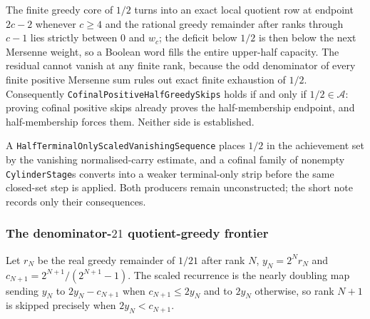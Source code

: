 \begin{thm}
The finite greedy core of $1/2$ turns into an exact local quotient row at
endpoint $2c-2$ whenever $c\ge4$ and the rational greedy remainder after
ranks through $c-1$ lies strictly between $0$ and $w_c$; the deficit below
$1/2$ is then below the next Mersenne weight, so a Boolean word fills the
entire upper-half capacity.  The residual cannot vanish at any finite rank,
because the odd denominator of every finite positive Mersenne sum rules out
exact finite exhaustion of $1/2$.  Consequently
\texttt{CofinalPositiveHalfGreedySkips} holds if and only if
$1/2\in\mathcal A$: proving cofinal positive skips already proves the
half-membership endpoint, and half-membership forces them.  Neither side is
established.
\par\noindent{}  
\end{thm}

\begin{obs}
A \texttt{HalfTerminalOnlyScaledVanishingSequence} places $1/2$ in the
achievement set by the vanishing normalised-carry estimate, and a cofinal
family of nonempty \texttt{CylinderStage}s converts into a weaker
terminal-only strip before the same closed-set step is applied.  Both
producers remain unconstructed; the short note records only their consequences.
\par\noindent{}  
\end{obs}

\subsubsection*{The denominator-$21$ quotient-greedy frontier}

Let $r_N$ be the real greedy remainder of $1/21$ after rank $N$, $y_N=2^Nr_N$
and $c_{N+1}=2^{N+1}/(2^{N+1}-1)$.  The scaled recurrence is the nearly
doubling map sending $y_N$ to $2y_N-c_{N+1}$ when $c_{N+1}\le2y_N$ and to
$2y_N$ otherwise, so rank $N+1$ is skipped precisely when $2y_N<c_{N+1}$.

